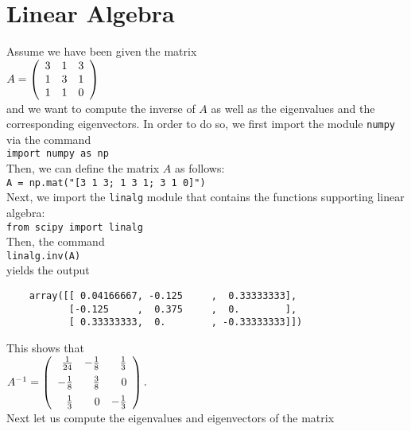 \documentclass{report}
\begin{document}
\section{Linear Algebra}
Assume we have been given the matrix
\\[0.2cm]
\hspace*{1.3cm}
$A = \left(
\begin{array}[c]{lll}
  3 & 1 & 3 \\
  1 & 3 & 1 \\
  1 & 1 & 0
\end{array}
\right)
$
\\[0.2cm]
and we want to compute the inverse of $A$ as well as the eigenvalues and the corresponding
eigenvectors.  In order to do so, we first import the module \texttt{numpy} via the command
\\[0.2cm]
\hspace*{1.3cm}
\texttt{import numpy as np}
\\[0.2cm]
Then, we can define the matrix $A$ as follows:
\\[0.2cm]
\hspace*{1.3cm}
\texttt{A = np.mat("[3 1 3; 1 3 1; 3 1 0]")}
\\[0.2cm]
Next, we import the \texttt{linalg} module that contains the functions supporting linear algebra:
\\[0.2cm]
\hspace*{1.3cm}
\texttt{from scipy import linalg}
\\[0.2cm]
Then, the command
\\[0.2cm]
\hspace*{1.3cm}
\texttt{linalg.inv(A)}
\\[0.2cm]
yields the output
\begin{verbatim}
    array([[ 0.04166667, -0.125     ,  0.33333333],
           [-0.125     ,  0.375     ,  0.        ],
           [ 0.33333333,  0.        , -0.33333333]])
\end{verbatim}
This shows that
\\[0.2cm]
\hspace*{1.3cm}
$A^{-1} = \left(
\begin{array}[c]{rrr}
  \frac{1}{24} & -\frac{1}{8} & \frac{1}{3} \\[0.2cm]
 -\frac{1}{8}  &  \frac{3}{8} & 0           \\[0.2cm]
  \frac{1}{3}  & 0 & -\frac{1}{3}
\end{array}
\right).
$
\\[0.2cm]
Next let us compute the eigenvalues and eigenvectors of the matrix
\end{document}
